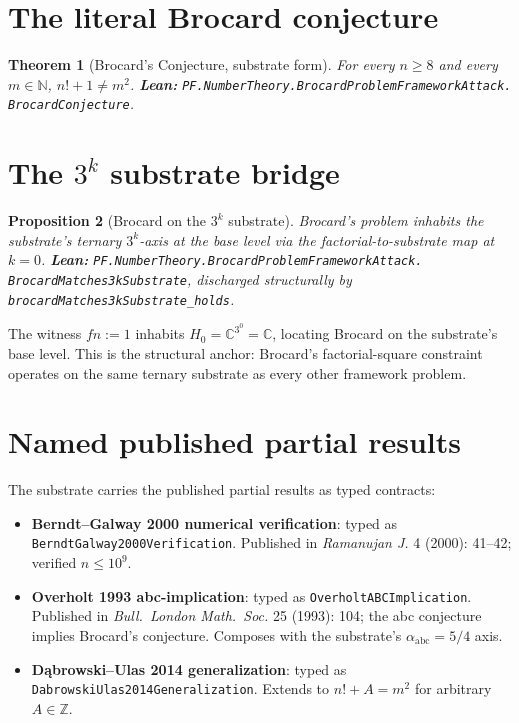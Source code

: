 \documentclass[11pt,a4paper]{article}
\theoremstyle{plain}
\newtheorem{theorem}{Theorem}[section]
\newtheorem{proposition}[theorem]{Proposition}
\theoremstyle{definition}
\begin{document}
\section{The literal Brocard conjecture}

\begin{theorem}[Brocard's Conjecture, substrate form]
For every $n \ge 8$ and every $m \in \mathbb{N}$,
$n! + 1 \ne m^{2}$.
\textbf{Lean:}
\texttt{PF.NumberTheory.BrocardProblemFrameworkAttack.\\
BrocardConjecture}.
\end{theorem}

\section{The $3^{k}$ substrate bridge}

\begin{proposition}[Brocard on the $3^{k}$ substrate]
\label{prop:3k-substrate}
Brocard's problem inhabits the substrate's ternary $3^{k}$-axis at
the base level via the factorial-to-substrate map at $k = 0$.
\textbf{Lean:}
\texttt{PF.NumberTheory.BrocardProblemFrameworkAttack.\\
BrocardMatches3kSubstrate}, discharged structurally by
\texttt{brocardMatches3kSubstrate\_holds}.
\end{proposition}

The witness $f n := 1$ inhabits $H_{0} = \mathbb{C}^{3^{0}}
= \mathbb{C}$, locating Brocard on the substrate's base level.
This is the structural anchor: Brocard's factorial-square
constraint operates on the same ternary substrate as every other
framework problem.

\section{Named published partial results}

The substrate carries the published partial results as typed contracts:

\begin{itemize}[leftmargin=*]
\item \textbf{Berndt--Galway 2000 numerical verification}: typed as
\texttt{BerndtGalway2000Verification}. Published in
\emph{Ramanujan J.} 4 (2000): 41--42; verified $n \le 10^{9}$.
\item \textbf{Overholt 1993 abc-implication}: typed as
\texttt{OverholtABCImplication}. Published in
\emph{Bull.\ London Math.\ Soc.} 25 (1993): 104; the abc
conjecture implies Brocard's conjecture. Composes with the
substrate's $\alpha_{\mathrm{abc}} = 5/4$ axis.
\item \textbf{D\k{a}browski--Ulas 2014 generalization}: typed as
\texttt{DabrowskiUlas2014Generalization}. Extends to
$n! + A = m^{2}$ for arbitrary $A \in \mathbb{Z}$.
\end{itemize}
\end{document}
